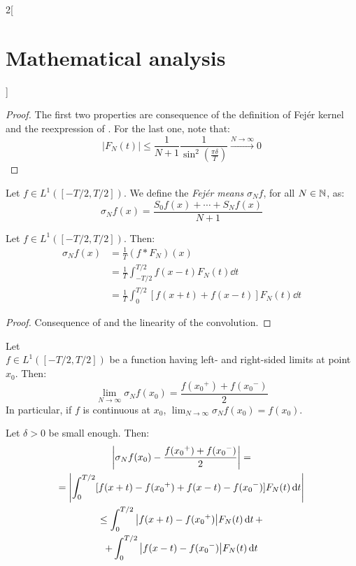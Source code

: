 \documentclass[../../../main_math.tex]{subfiles}
\begin{document}
\begin{multicols}{2}[\section{Mathematical analysis}]
\begin{proposition}
\begin{enumerate}
    \end{enumerate}
  \end{proposition}
  \begin{proof}
    The first two properties are consequence of the definition of Fejér kernel and the reexpression of . For the last one, note that:
    $$|F_N(t)|\leq \frac{1}{N+1}\frac{1}{\sin^2\left(\frac{\pi \delta}{T}\right)}\overset{N\to\infty}{\longrightarrow} 0$$
  \end{proof}
  \begin{definition}
    Let $f\in L^1([-T/2,T/2])$. We define the \emph{Fejér means} $\sigma_Nf$, for all $N\in\mathbb{N} $, as:
    \begin{equation}\label{MA:fejermeans}
      \sigma_Nf(x)=\frac{S_0f(x)+\cdots+S_Nf(x)}{N+1}
    \end{equation}
  \end{definition}
  \begin{proposition}
    Let $f\in L^1([-T/2,T/2])$. Then:
    \begin{align*}
      \sigma_Nf(x) & =\frac{1}{T}(f*F_N)(x)                              \\
                   & =\frac{1}{T}\int_{-T/2}^{T/2}f(x-t)F_N(t)\dd{t}     \\
                   & =\frac{1}{T}\int_0^{T/2}[f(x+t)+f(x-t)]F_N(t)\dd{t}
    \end{align*}
  \end{proposition}
  \begin{proof}
    Consequence of  and the linearity of the convolution.
  \end{proof}
  \begin{theorem}\label{MA:fejerthm0}
    Let \\$f\in L^1([-T/2,T/2])$ be a function having left- and right-sided limits at point $x_0$. Then: $$\lim_{N\to\infty}\sigma_Nf(x_0)=\frac{f({x_0}^+)+f({x_0}^-)}{2}$$ In particular, if $f$ is continuous at $x_0$, $\displaystyle\lim_{N\to\infty}\sigma_Nf(x_0)=f(x_0).$
  \end{theorem}
  \begin{sproof}
    Let $\delta>0$ be small enough. Then:
    \begin{multline*}
      \abs{\sigma_Nf(x_0)-\frac{f({x_0}^+)+f({x_0}^-)}{2}}=\\
      =\abs{\int_0^{T/2}[f(x+t)-f({x_0}^+)+f(x-t)-f({x_0}^-)]F_N(t)\dd{t}} \\
      \leq \int_0^{T/2}\abs{f(x+t)-f({x_0}^+)}F_N(t)\dd{t}+\\+\int_0^{T/2}\abs{f(x-t)-f({x_0}^-)}F_N(t)\dd{t}

\end{multline*}
\end{sproof}
\end{multicols}
\end{document}
